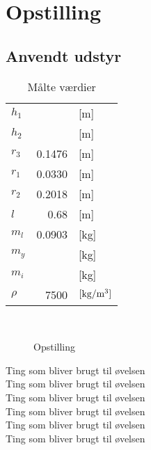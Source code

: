 \section{Opstilling}
\subsection*{Anvendt udstyr}
                                
\begin{wraptable}[2]{R}[2cm]{0.66\textwidth}
\vspace{-1.5\baselineskip}
  \begin{tabular}{lrl}
  \textbf{$h_{1}$}      &        & [m]  \\ 
  \textbf{$h_{2}$}      &        & [m]  \\   
  \textbf{$r_{3}$}      & 0.1476 & [m]  \\   
  \textbf{$r_{1}$}      & 0.0330 & [m]  \\  
  \textbf{$r_{2}$}      & 0.2018 & [m]  \\    
  \textbf{$l$}          & 0.68   & [m]  \\  
  \textbf{$m_{l}$}      & 0.0903 & [kg] \\
  \textbf{$m_{y}$}      &        & [kg] \\ 
  \textbf{$m_{i}$}      &        & [kg] \\
  \textbf{$\rho$}       & 7500   & $\left[\text{kg/m\textsuperscript{3}}\right]$  \\ 
  
  \end{tabular}
  \caption{Målte værdier}\label{tab:maal}
\end{wraptable}~
\begin{wrapfigure}[33]{R}[2cm]{0.66\textwidth}
\vspace{-6.5\baselineskip}
\par
{}
\par
{}
\caption{Opstilling}
\end{wrapfigure}
Ting som bliver brugt til øvelsen  \\
Ting som bliver brugt til øvelsen  \\
Ting som bliver brugt til øvelsen  \\
Ting som bliver brugt til øvelsen  \\
Ting som bliver brugt til øvelsen  \\
Ting som bliver brugt til øvelsen  \\
                                   
